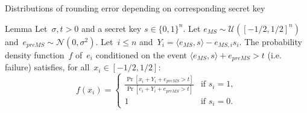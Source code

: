 \documentclass{beamer}
\begin{document}
	\begin{frame}{Distributions of rounding error depending on corresponding secret key}
		\begin{block}{Lemma}
			Let~$\sigma,t>0$ and a secret key $s \in \{0,1\}^n$. Let $e_{MS} \sim \mathcal{U}([-1/2, 1/2]^n)$ 
			and~$e_{preMS} \sim \mathcal{N}(0, \sigma^2)$. Let~$i \leq n$ and~$Y_i = \langle e_{MS}, s \rangle - e_{MS, i} s_i$.
			The probability density function~$f$ of~$e_i$ conditioned on the event $\langle e_{MS}, s \rangle + e_{preMS} > t$ (i.e. failure) satisfies, for all~$x_i \in [-1/2,1/2]$: 
			\[
			f(x_i) = \left\{
			\begin{array}{ll}
				\frac{\Pr[x_i + Y_i + e_{preMS} > t]}{\Pr[  e_i + Y_i + e_{preMS} > t]}& \text{if } s_i=1, \\
				1& \text{if } s_i = 0.
			\end{array}\right.\]
		\end{block}
	\end{frame}




\end{document}
